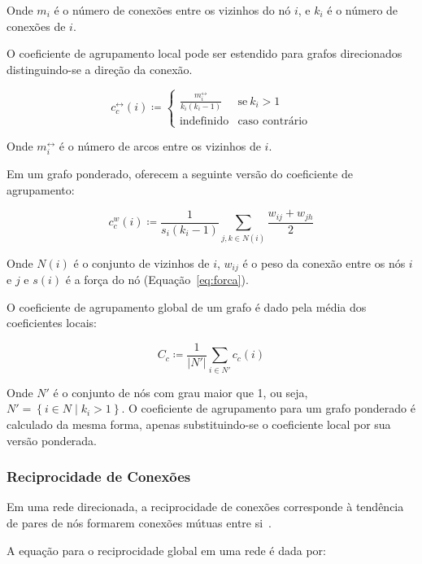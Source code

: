 \documentclass[12pt,a4paper]{article}
\theoremstyle{hypo}
\newcommand{\defn}{\coloneqq} %
\newcommand{\linkboth}[1]{#1^\leftrightarrow} %
\newcommand{\weighted}[1]{#1^w} %
\begin{document}
Onde $m_i$ é o número de conexões entre os vizinhos do nó $i$, e $k_i$ é o número de conexões de $i$.

O coeficiente de agrupamento local pode ser estendido para grafos direcionados distinguindo-se a direção da conexão.

\begin{equation}
\linkboth{c}_c(i) \defn \begin{cases}
    \frac{\linkboth{m}_i}{k_i(k_i - 1)} & \text{se}\ k_i > 1 \\
    \text{indefinido}                  & \text{caso contrário}
  \end{cases}
\end{equation}

Onde $\linkboth{m}_i$ é o número de arcos entre os vizinhos de $i$.

Em um grafo ponderado,  oferecem a seguinte versão do coeficiente de agrupamento:

\begin{equation}
\weighted{c}_c(i) \defn \frac{1}{s_i(k_i - 1)} \sum_{j,k \in N(i)} \frac{w_{ij} + w_{jh}}{2}
\end{equation}

Onde $N(i)$ é o conjunto de vizinhos de $i$, $w_{ij}$ é o peso da conexão entre os nós $i$ e $j$ e $s(i)$ é a força do nó (Equação~\ref{eq:forca}).

O coeficiente de agrupamento global de um grafo é dado pela média dos coeficientes locais:

\begin{equation}
C_c \defn \frac{1}{|N'|} \sum_{i \in N'} c_c(i)
\end{equation}

Onde $N'$ é o conjunto de nós com grau maior que 1, ou seja, $N' = \left\lbrace i \in N \mid k_i > 1 \right\rbrace$. O coeficiente de agrupamento para um grafo ponderado é calculado da mesma forma, apenas substituindo-se o coeficiente local por sua versão ponderada.

\subsubsection{Reciprocidade de Conexões} \label{sec:reciprocidade}

Em uma rede direcionada, a reciprocidade de conexões corresponde à tendência de pares de nós formarem conexões mútuas entre si~\cite{Garlaschelli2004-db}.

A equação para o reciprocidade global em uma rede é dada por:
\end{document}
